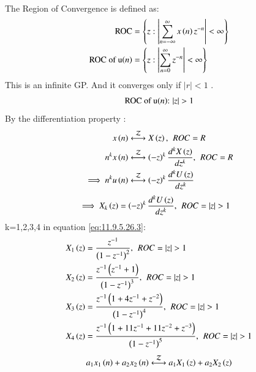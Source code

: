 \documentclass[journal,12pt,twocolumn]{IEEEtran}
\theoremstyle{remark}
\begin{document}
\begin{enumerate}[label=\arabic*.]
\begin{align}
\end{align}
The Region of Convergence  is defined as:
\begin{align}\label{eq:11.9.5.26.2}
    \text{ROC} &= \left\{ z : \left\lvert \sum_{n=-\infty}^{\infty} x\left(n\right)z^{-n} \right\rvert < \infty \right\}\\
    \text{ROC of u\ensuremath{\left(n\right)}} &= \left\{ z : \left\lvert \sum_{n=0}^{\infty}z^{-n} \right\rvert < \infty \right\}
\end{align}
This is an infinite GP. And it converges only if $|r|<1$ .
\begin{equation}
    \text{ROC of u\ensuremath{\left(n\right)}: } |z| > 1
\end{equation}
By the differentiation property :
\begin{align}
x\left(n\right) &\stackrel{\mathcal{Z}}{\longleftrightarrow} X\left(z\right),\hspace{4pt} ROC = R\\
n^k x\left(n\right) &\stackrel{\mathcal{Z}}{\longleftrightarrow} \left(-z\right)^k \frac{d^kX\left(z\right)}{dz^k},\hspace{4pt} ROC = R \\
\implies n^k u\left(n\right) &\stackrel{\mathcal{Z}}{\longleftrightarrow} \left(-z\right)^k \frac{d^kU\left(z\right)}{dz^k}
\end{align}
\begin{align}
    \implies X_k\brak{z} &=  \brak{-z}^k \frac{d^kU\brak{z}}{dz^k} , \hspace{4pt}ROC=|z|>1\label{eq:11.9.5.26.3} 
\end{align}
 k=1,2,3,4 in equation \eqref{eq:11.9.5.26.3}:
\begin{align}
X_1\brak{z} &= \frac{z^{-1}}{\brak{1-z^{-1}}^2}  , \hspace{4pt} ROC=|z|>1\\
    X_2\brak{z} &= \frac{z^{-1}\brak{z^{-1}+1}}{\brak{1-z^{-1}}^3} , \hspace{4pt} ROC=|z|>1\\
    X_3\brak{z} &= \frac{z^{-1}\brak{1+4z^{-1}+z^{-2}}}{\brak{1-z^{-1}}^4}, \hspace{4pt} ROC=|z|>1\\
    X_4\brak{z} &= \frac{z^{-1}\brak{1+11z^{-1}+11z^{-2}+z^{-3}}}{\brak{1-z^{-1}}^5}, \hspace{4pt} ROC=|z|>1
\end{align}
\begin{align}
    a_1 x_1\brak{n} + a_2 x_2\brak{n} &\stackrel{\mathcal{Z}}{\longleftrightarrow} a_1 X_1\brak{z} + a_2 X_2\brak{z} \label{eq:combined_signal} \\

\end{align}
\end{enumerate}
\end{document}
